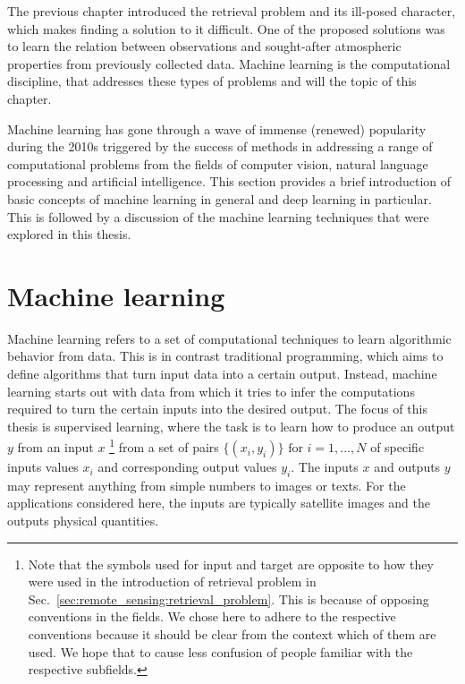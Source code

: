 
The previous chapter introduced the retrieval problem and its ill-posed
character, which makes finding a solution to it difficult. One of the proposed
solutions was to learn the relation between observations and sought-after
atmospheric properties from previously collected data. Machine learning is the
computational discipline, that addresses these types of problems and will the
topic of this chapter.

Machine learning has gone through a wave of immense (renewed) popularity during
the 2010s triggered by the success of  methods in
addressing a range of computational problems from the fields of computer vision,
natural language processing and artificial intelligence. This section provides a
brief introduction of basic concepts of machine learning in general and deep
learning in particular. This is followed by a discussion of the machine learning
techniques that were explored in this thesis.

\section{Machine learning}

Machine learning refers to a set of computational techniques
to learn algorithmic behavior from data. This is in contrast traditional
programming, which aims to define algorithms that turn input data into a
certain output. Instead, machine learning starts out with data from which it
tries to infer the computations required to turn the certain inputs into the
desired output. The focus of this thesis is  supervised learning, where the
task is to learn how to produce an output $y$ from an input $x$
\footnote{Note that the symbols used for input and target are opposite to how
they were used in the introduction of retrieval problem in
Sec.~\ref{sec:remote_sensing:retrieval_problem}. This is because of opposing
conventions in the fields. We chose here to adhere to the respective conventions
because it should be clear from the context which of them are used. We hope that
to cause less confusion of people familiar with the respective subfields.}
from a set of pairs $\{(x_i, y_i)\}\text{ for }i = 1, \ldots, N$ of specific inputs values $x_i$ and
corresponding output values $y_i$. The inputs $x$ and outputs $y$ may
represent anything from simple numbers to images or texts. For the
applications considered here, the inputs are typically satellite images and
the outputs physical quantities.%

